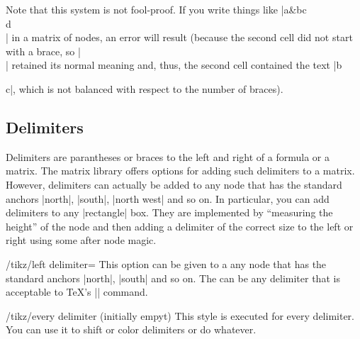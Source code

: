 Note that this system is not fool-proof. If you write things like
|a&b{c\\d}\\| in a matrix of nodes, an error will result (because the
second cell did not start with a brace, so |\\| retained its normal
meaning and, thus, the second cell contained the text |b{c|, which is
not balanced with respect to the number of braces).

\subsection{Delimiters}

Delimiters are parantheses or braces to the left and right of a
formula or a matrix. The matrix library offers options for adding such
delimiters to a matrix. However, delimiters can actually be added to
any node that has the standard anchors |north|, |south|, |north west|
and so on. In particular, you can add delimiters to any |rectangle|
box. They are implemented by ``measuring the height'' of the node and
then adding a delimiter of the correct size to the left or right using
some after node magic.

\begin{key}{/tikz/left delimiter=}
  This option can be given to a any node that has the standard anchors
  |north|, |south| and so on. The  can be any
  delimiter that is acceptable to \TeX's |\left| command.
\begin{codeexample}[]
\end{codeexample}

\begin{codeexample}[]
\end{codeexample}

  \begin{stylekey}{/tikz/every delimiter (initially \normalfont empyt)}
    This style is executed for every delimiter. You can use it to shift
    or color delimiters or do whatever.
  \end{stylekey}


\end{key}}

